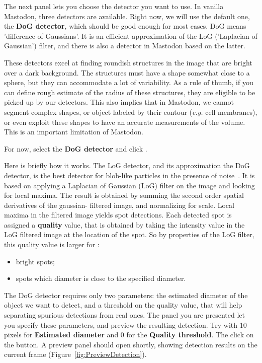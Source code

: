 The next panel lets you choose the detector you want to use.
In vanilla Mastodon, three detectors are available.
Right now, we will use the default one, the \textbf{DoG detector}, which should be good enough for most cases.
DoG means 'difference-of-Gaussians'.
It is an efficient approximation of the LoG ('Laplacian of Gaussian') filter, and there is also a detector in Mastodon based on the latter.

These detectors excel at finding roundish structures in the image that are bright over a dark background.
The structures must have a shape somewhat close to a sphere, but they can accommodate a lot of variability.
As a rule of thumb, if you can define rough estimate of the radius of these structures, they are eligible to be picked up by our detectors. 
This also implies that in Mastodon, we cannot segment complex shapes, or object labeled by their contour (\textit{e.g.} cell membranes), or even exploit these shapes to have an accurate measurements of the volume. 
This is an important limitation of Mastodon.

For now, select the \textbf{DoG detector} and click .
\label{sec:DetectionCellsDoGDetector}

Here is briefly  how it works.
The LoG detector, and its approximation the DoG detector, is the best detector for blob-like particles in the presence of noise~\cite{Sage2005}. 
It is based on applying a Laplacian of Gaussian (LoG) filter on the image and looking for local maxima. The result is obtained by summing the second order spatial derivatives of the gaussian- filtered image, and normalizing for scale.
Local maxima in the filtered image yields spot detections. 
Each detected spot is assigned a \textbf{quality} value, that is obtained by taking the intensity value in the LoG filtered image at the location of the spot.
So by properties of the LoG filter, this quality value is larger for :
\begin{itemize}
    \item bright spots;
    \item spots which diameter is close to the specified diameter.
\end{itemize}

The DoG detector requires only two parameters: the estimated diameter of the object we want to detect, and a threshold on the quality value, that will help separating spurious detections from real ones. 
The panel you are presented let you specify these parameters, and preview the resulting detection.
Try with 10 pixels for \textbf{Estimated diameter} and 0 for the \textbf{Quality threshold}.
The click on the  button.
A preview panel should open shortly, showing detection results on the current frame (Figure~\ref{fig:PreviewDetection}).

